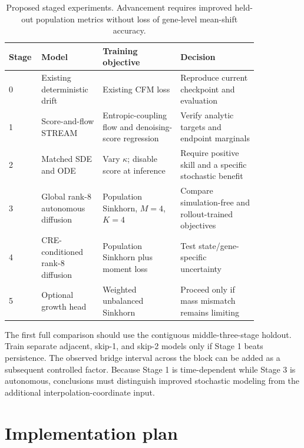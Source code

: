 \documentclass[11pt]{article}
\begin{document}
\begin{table}[ht]
\centering
\caption{Proposed staged experiments. Advancement requires improved held-out
population metrics without loss of gene-level mean-shift accuracy.}
\small
\setlength{\tabcolsep}{4pt}
\begin{tabular}{p{0.06\linewidth}p{0.22\linewidth}p{0.28\linewidth}p{0.28\linewidth}}
\toprule
Stage & Model & Training objective & Decision \\
\midrule
0 & Existing deterministic drift & Existing CFM loss & Reproduce current checkpoint and evaluation \\
1 & Score-and-flow STREAM & Entropic-coupling flow and denoising-score regression & Verify analytic targets and endpoint marginals \\
2 & Matched SDE and ODE & Vary $\kappa$; disable score at inference & Require positive skill and a specific stochastic benefit \\
3 & Global rank-8 autonomous diffusion & Population Sinkhorn, $M=4$, $K=4$ & Compare simulation-free and rollout-trained objectives \\
4 & CRE-conditioned rank-8 diffusion & Population Sinkhorn plus moment loss & Test state/gene-specific uncertainty \\
5 & Optional growth head & Weighted unbalanced Sinkhorn & Proceed only if mass mismatch remains limiting \\
\bottomrule
\end{tabular}
\end{table}

The first full comparison should use the contiguous middle-three-stage holdout.
Train separate adjacent, skip-1, and skip-2 models only if Stage 1 beats
persistence. The observed bridge interval across the block can be added as a
subsequent controlled factor. Because Stage 1 is time-dependent while Stage 3
is autonomous, conclusions must distinguish improved stochastic modeling from
the additional interpolation-coordinate input.

\section{Implementation plan}
\end{document}
